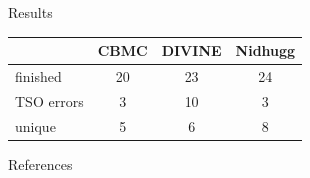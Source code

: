 \documentclass[final, 20pt, a0]{beamer}
\newlength{\sepwid}
\newlength{\marginwid}
\newlength{\onecolwid}
\newlength{\twocolwid}
\begin{document}
\begin{frame}[t]
\begin{columns}[t]
\begin{column}{\twocolwid}
\begin{columns}[t,totalwidth=\twocolwid]
\begin{column}{\onecolwid}
\begin{block}{Results}
\begingroup
\bigskip
\centering
\setlength\tabcolsep{0.5em} %
\renewcommand{\arraystretch}{1.1} %
\begin{tabular}{l|ccc}
               & CBMC & DIVINE & Nidhugg \\ \hline
    finished   & 20   & 23     & 24 \\
    TSO errors &  3   & 10     &  3 \\
    unique     &  5   &  6     &  8
\end{tabular}
\endgroup
\end{block}

\begin{block}{References}
\small


\end{block}


\end{column} %

\end{columns} %

\end{column} %

\begin{column}{\sepwid}\end{column} %

\begin{column}{\marginwid}\end{column} %

\end{columns} %

\end{frame} %
\end{document}
